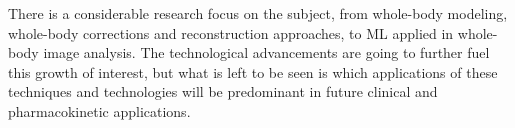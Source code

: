 There is a considerable research focus on the subject, from whole-body modeling, whole-body corrections and reconstruction approaches, to ML applied in whole-body image analysis. The technological advancements are going to further fuel this growth of interest, but what is left to be seen is which applications of these techniques and technologies will be predominant in future clinical and pharmacokinetic applications.